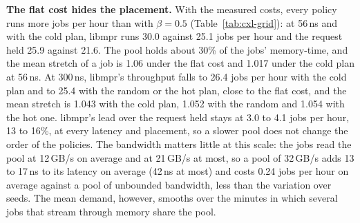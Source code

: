 \documentclass[11pt]{article}
\newcommand{\tabref}[1]{Table~\ref{#1}}
\begin{document}
\textbf{The flat cost hides the placement.} With the measured costs, every policy runs more jobs per hour than with
$\beta = 0.5$ (\tabref{tab:cxl-grid}): at 56\,ns and with the cold plan, libmpr runs 30.0 against 25.1 jobs per hour
and the request held 25.9 against 21.6. The pool holds about 30\% of the jobs' memory-time, and the mean stretch of a job
is 1.06 under the flat cost and 1.017 under the cold plan at 56\,ns. At 300\,ns, libmpr's throughput falls to 26.4
jobs per hour with the cold plan and to 25.4 with the random or the hot plan, close to the flat cost, and the mean
stretch is 1.043 with the cold plan, 1.052 with the random and 1.054 with the hot one. libmpr's lead over the request held stays at
3.0 to 4.1 jobs per hour, 13 to 16\%, at every latency and placement, so a slower pool does not change the order of the
policies. The bandwidth matters little at this scale: the jobs read the pool at 12\,GB/s on average and at
21\,GB/s at most, so a pool of 32\,GB/s adds 13 to 17\,ns to its latency on average (42\,ns at most) and costs 0.24
jobs per hour on average against a pool of unbounded bandwidth, less than the variation over seeds. The mean demand, however, smooths over the minutes in which several jobs that stream
through memory share the pool.

\begin{table}[t]
\centering
\footnotesize
\caption{The pool minute by minute, at an idle added latency of 300\,ns: the jobs' demand on the pool (mean,
95th percentile and largest minute), the share of the steady minutes in which it exceeds the bandwidth, the pool's
added latency, and the throughput with each placement, means over the 6 policies, both loads and 3 seeds (36 runs
per cell); the last column is the throughput of the cold plan with the latency set from the mean demand
(\tabref{tab:cxl-grid}), which the 16\,GB/s pool was not run with.}
\label{tab:cxl-minute}
\setlength{\tabcolsep}{3pt}

\end{table}
\end{document}
